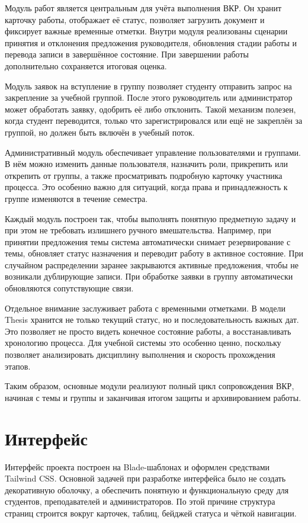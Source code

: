\documentclass[14pt,a4paper]{extreport}
\begin{document}
Модуль работ является центральным для учёта выполнения ВКР.
Он хранит карточку работы, отображает её статус, позволяет загрузить документ
и фиксирует важные временные отметки.
Внутри модуля реализованы сценарии принятия и отклонения предложения
руководителя, обновления стадии работы и перевода записи в завершённое
состояние.
При завершении работы дополнительно сохраняется итоговая оценка.

Модуль заявок на вступление в группу позволяет студенту отправить запрос на
закрепление за учебной группой.
После этого руководитель или администратор может обработать заявку, одобрить
её либо отклонить.
Такой механизм полезен, когда студент переводится, только что
зарегистрировался или ещё не закреплён за группой, но должен быть включён
в учебный поток.

Административный модуль обеспечивает управление пользователями и группами.
В нём можно изменить данные пользователя, назначить роли, прикрепить или
открепить от группы, а также просматривать подробную карточку участника
процесса.
Это особенно важно для ситуаций, когда права и принадлежность к группе
изменяются в течение семестра.

Каждый модуль построен так, чтобы выполнять понятную предметную задачу и при
этом не требовать излишнего ручного вмешательства.
Например, при принятии предложения темы система автоматически снимает
резервирование с темы, обновляет статус назначения и переводит работу в
активное состояние.
При случайном распределении заранее закрываются активные предложения, чтобы
не возникали дублирующие записи.
При обработке заявки в группу автоматически обновляются сопутствующие связи.

Отдельное внимание заслуживает работа с временными отметками.
В модели Thesis хранится не только текущий статус, но и последовательность
важных дат.
Это позволяет не просто видеть конечное состояние работы, а восстанавливать
хронологию процесса.
Для учебной системы это особенно ценно, поскольку позволяет анализировать
дисциплину выполнения и скорость прохождения этапов.

Таким образом, основные модули реализуют полный цикл сопровождения ВКР,
начиная с темы и группы и заканчивая итогом защиты и архивированием работы.

\section{Интерфейс}

Интерфейс проекта построен на Blade-шаблонах и оформлен средствами
Tailwind CSS.
Основной задачей при разработке интерфейса было не создать декоративную
оболочку, а обеспечить понятную и функциональную среду для студентов,
преподавателей и администраторов.
По этой причине структура страниц строится вокруг карточек, таблиц, бейджей
статуса и чёткой навигации.
\end{document}
